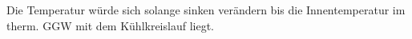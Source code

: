 Die Temperatur würde sich solange sinken verändern bis die Innentemperatur im therm. GGW mit dem Kühlkreislauf liegt.